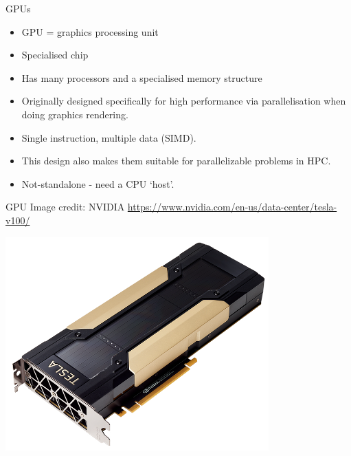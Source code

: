 \documentclass[usenames,dvipsnames]{beamer}
\begin{document}
\begin{frame}{GPUs}
  \begin{block}{}
    \begin{itemize}
      \item{GPU  = graphics processing unit}
      \item{Specialised chip}
      \item{Has many processors and a specialised memory structure}
      \item{Originally designed specifically for high performance via parallelisation when doing graphics rendering.}
      \item{Single instruction, multiple data (SIMD).}
      \item{This design also makes them suitable for parallelizable problems in HPC.}
      \item{Not-standalone - need a CPU `host'.}
    \end{itemize}
  \end{block}
\end{frame}

\begin{frame}{GPU \tiny{Image credit: NVIDIA \url{https://www.nvidia.com/en-us/data-center/tesla-v100/}}}
  \begin{block}{}
    \begin{center}
      \includegraphics[scale=0.83]{V100_photo.png}
    \end{center}
  \end{block}
\end{frame}
\end{document}
